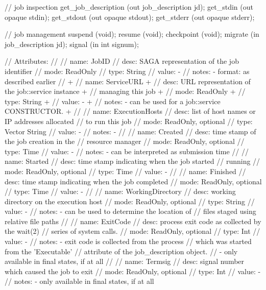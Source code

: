 \begin{myspec}
{{      // job inspection
      get_job_description  (out job_description jd);
      get_stdin            (out opaque          stdin);
      get_stdout           (out opaque          stdout);
      get_stderr           (out opaque          stderr);
 
      // job management
      suspend              (void);
      resume               (void);
      checkpoint           (void);
      migrate              (in job_description   jd);
      signal               (in int               signum);
 
      // Attributes:
      //
      //   name:  JobID
      //   desc:  SAGA representation of the job identifier
      //   mode:  ReadOnly
      //   type:  String
      //   value: -
      //   notes: - format: as described earlier
      // 
+     //   name:  ServiceURL
+     //   desc:  URL representation of the job::service instance
+     //          managing this job
+     //   mode:  ReadOnly
+     //   type:  String
+     //   value: -
+     //   notes: - can be used for a job::service CONSTRUCTOR.
+     // 
      //   name:  ExecutionHosts
      //   desc:  list of host names or IP addresses allocated 
      //          to run this job
      //   mode:  ReadOnly, optional
      //   type:  Vector String
      //   value: -
      //   notes: - 
      // 
      //   name:  Created
      //   desc:  time stamp of the job creation in the 
      //          resource manager
      //   mode:  ReadOnly, optional
      //   type:  Time
      //   value: -
      //   notes: - can be interpreted as submission time
      // 
      //   name:  Started
      //   desc:  time stamp indicating when the job started 
      //          running
      //   mode:  ReadOnly, optional
      //   type:  Time
      //   value: -
      // 
      //   name:  Finished
      //   desc:  time stamp indicating when the job completed
      //   mode:  ReadOnly, optional
      //   type:  Time
      //   value: -
      // 
      //   name:  WorkingDirectory
      //   desc:  working directory on the execution host 
      //   mode:  ReadOnly, optional
      //   type:  String
      //   value: -
      //   notes: - can be used to determine the location of 
      //            files staged using relative file paths
      // 
      //   name:  ExitCode
      //   desc:  process exit code as collected by the wait(2)
      //          series of system calls. 
      //   mode:  ReadOnly, optional
      //   type:  Int
      //   value: -
      //   notes: - exit code is collected from the process 
      //            which was started from the 'Executable' 
      //            attribute of the job_description object.  
      //          - only available in final states, if at all
      // 
      //   name:  Termsig
      //   desc:  signal number which caused the job to exit
      //   mode:  ReadOnly, optional
      //   type:  Int
      //   value: -
      //   notes: - only available in final states, if at all
 
}}
\end{myspec}
